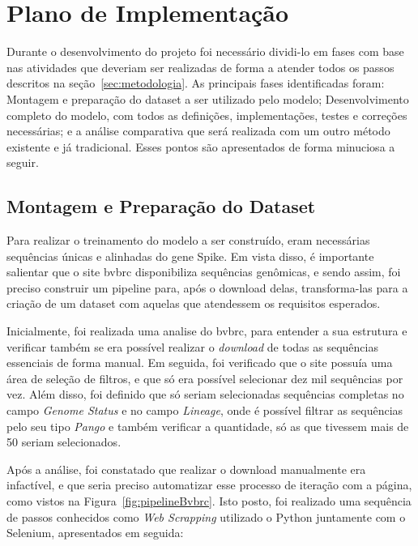 
\section{Plano de Implementação}
Durante o desenvolvimento do projeto foi necessário dividi-lo em fases com base nas atividades que deveriam ser realizadas de forma a atender todos os passos descritos na seção~\ref{sec:metodologia}. As principais fases identificadas foram: Montagem e preparação do dataset a ser utilizado pelo modelo; Desenvolvimento completo do modelo, com todos as definições, implementações, testes e correções necessárias; e a análise comparativa que será realizada com um outro método existente e já tradicional. Esses pontos são apresentados de forma minuciosa a seguir.

\subsection{Montagem e Preparação do Dataset}
Para realizar o treinamento do modelo a ser construído, eram necessárias sequências únicas e alinhadas do gene Spike. Em vista disso, é importante salientar que o site \gls{bvbrc} disponibiliza sequências genômicas, e sendo assim, foi preciso construir um pipeline para, após o download delas, transforma-las para a criação de um dataset com aquelas que atendessem os requisitos esperados.

Inicialmente, foi realizada uma analise do \gls{bvbrc}, para entender a sua estrutura e verificar também se era possível realizar o \textit{download} de todas as sequências essenciais de forma manual. Em seguida, foi verificado que o site possuía uma área de seleção de filtros, e que só era possível selecionar dez mil sequências por vez. Além disso, foi definido que só seriam selecionadas sequências completas no campo \textit{Genome Status} e no campo \textit{Lineage}, onde é possível filtrar as sequências pelo seu tipo \textit{Pango} e também verificar a quantidade, só as que tivessem mais de 50 seriam selecionados.

Após a análise, foi constatado que realizar o download manualmente era infactível, e que seria preciso automatizar esse processo de iteração com a página, como vistos na Figura~\ref{fig:pipelineBvbrc}. Isto posto, foi realizado uma sequência de passos conhecidos como \textit{Web Scrapping} utilizado o Python juntamente com o Selenium, apresentados em seguida:

